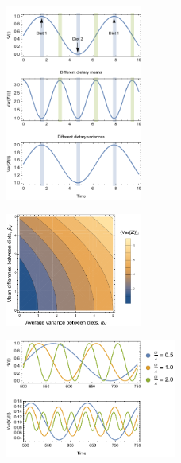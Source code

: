 \documentclass{frontiersSCNS}
\begin{document}
\begin{figure}[h!]
\centering
\includegraphics[width=0.4\textwidth]{fig_varZt.pdf}
\caption{
}
  \label{figvarZt}
\end{figure}

\begin{figure}[h!]
\centering
\includegraphics[width=0.4\textwidth]{fig_varzContour.pdf}
\caption{
}
  \label{figvarcont}
\end{figure}


\begin{figure}[h!]
\centering
\includegraphics[width=0.5\textwidth]{fig_xcsin.pdf}
\caption{
}
  \label{figxcsin}
\end{figure}
\end{document}

